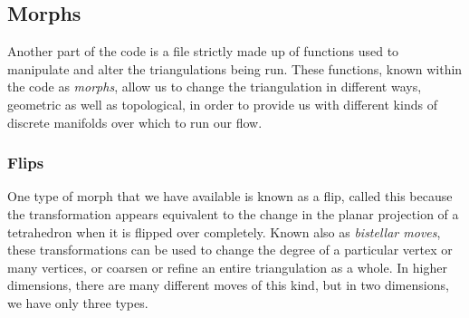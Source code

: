 \documentclass[12pt]{article}
\begin{document}
\subsection{Morphs}

Another part of the code is a file strictly made up of functions used to manipulate and alter the triangulations being run. These functions, known within the code as \textit{morphs}, allow us to change the triangulation in different ways, geometric as well as topological, in order to provide us with different kinds of discrete manifolds over which to run our flow.

\subsubsection{Flips}

One type of morph that we have available is known as a flip, called this because the transformation appears equivalent to the change in the planar projection of a tetrahedron when it is flipped over completely. Known also as \textit{bistellar moves}, these transformations can be used to change the degree of a particular vertex or many vertices, or coarsen or refine an entire triangulation as a whole. In higher dimensions, there are many different moves of this kind, but in two dimensions, we have only three types.
\end{document}
